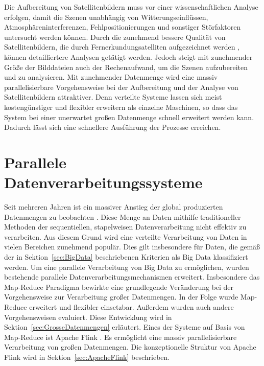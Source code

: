Die Aufbereitung von Satellitenbildern muss vor einer wissenschaftlichen Analyse erfolgen, damit die Szenen unabhängig von Witterungseinflüssen, Atmosphäreninterferenzen, Fehlpositionierungen und sonstiger Störfaktoren untersucht werden können. Durch die zunehmend bessere Qualität von Satellitenbildern, die durch Fernerkundungsatelliten aufgezeichnet werden \cite{Markham2004}, können detailliertere Analysen getätigt werden. Jedoch steigt mit zunehmender Größe der Bilddateien auch der Rechenaufwand, um die Szenen aufzubereiten und zu analysieren. Mit zunehmender Datenmenge wird eine massiv parallelisierbare Vorgehensweise bei der Aufbereitung und der Analyse von Satellitenbildern attraktiver. Denn verteilte Systeme lassen sich meist kostengünstiger und flexibler erweitern als einzelne Maschinen, so dass das System bei einer unerwartet großen Datenmenge schnell erweitert werden kann. Dadurch lässt sich eine schnellere Ausführung der Prozesse erreichen.


\section{Parallele Datenverarbeitungssysteme}
Seit mehreren Jahren ist ein massiver Anstieg der global produzierten Datenmengen zu beobachten \cite{EMC2014}. Diese Menge an Daten mithilfe traditioneller Methoden der sequentiellen, stapelweisen Datenverarbeitung nicht effektiv zu verarbeiten. Aus diesem Grund wird eine verteilte Verarbeitung von Daten in vielen Bereichen zunehmend populär. Dies gilt insbesondere für Daten, die gemäß der in Sektion~\ref{sec:BigData} beschriebenen Kriterien als Big Data klassifiziert werden. Um eine parallele Verarbeitung von Big Data zu ermöglichen, wurden bestehende parallele Datenverarbeitungsmechanismen erweitert. Insbesondere das Map-Reduce Paradigma \cite{Dean2004} bewirkte eine grundlegende Veränderung bei der Vorgehensweise zur Verarbeitung großer Datenmengen. In der Folge wurde Map-Reduce erweitert und flexibler einsetzbar. Außerdem wurden auch andere Vorgehensweisen evaluiert. Diese Entwicklung wird in Sektion~\ref{sec:GrosseDatenmengen} erläutert. Eines der Systeme auf Basis von Map-Reduce ist Apache Flink \cite{FlinkWebsite}. Es ermöglicht eine massiv parallelisierbare Verarbeitung von großen Datenmengen. Die konzeptionelle Struktur von Apache Flink wird in Sektion~\ref{sec:ApacheFlink} beschrieben.

